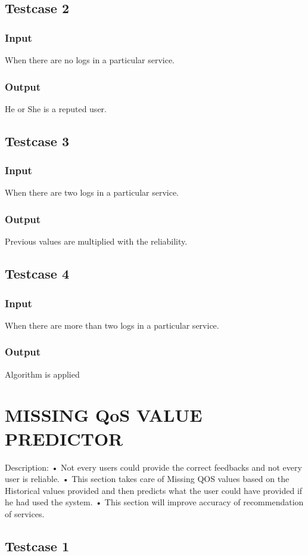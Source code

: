 \subsection{Testcase 2}
\subsubsection{Input}
When there are no logs in a particular service.
\subsubsection{Output}
He or She is a reputed user.
\subsection{Testcase 3}
\subsubsection{Input}
When there are two logs in a particular service.
\subsubsection{Output}
Previous values are multiplied with the reliability.
\subsection{Testcase 4}
\subsubsection{Input}
When there are more than two logs in a particular service.
\subsubsection{Output}
Algorithm is applied

\section{MISSING QoS VALUE PREDICTOR}
Description:
•	Not every users could provide the correct feedbacks and not every user is reliable.
•	This section takes care of Missing QOS values based on the Historical values provided and then predicts what  the user could have provided if he had used the system.
•	This section will improve accuracy of recommendation of services.

\subsection{Testcase 1}
